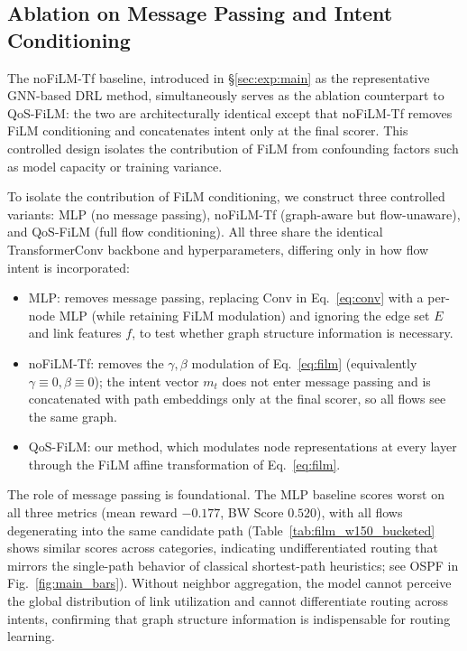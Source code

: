 \subsection{Ablation on Message Passing and Intent Conditioning}
\label{sec:exp:repr}
The noFiLM-Tf baseline, introduced in \S\ref{sec:exp:main} as the representative GNN-based DRL method, simultaneously serves as the ablation counterpart to QoS-FiLM: the two are architecturally identical except that noFiLM-Tf removes FiLM conditioning and concatenates intent only at the final scorer. This controlled design isolates the contribution of FiLM from confounding factors such as model capacity or training variance.

To isolate the contribution of FiLM conditioning, we construct three controlled variants: MLP (no message passing), noFiLM-Tf (graph-aware but flow-unaware), and QoS-FiLM (full flow conditioning). All three share the identical TransformerConv backbone and hyperparameters, differing only in how flow intent is incorporated:
\begin{itemize}
\item MLP: removes message passing, replacing $\mathrm{Conv}$ in Eq.~\eqref{eq:conv} with a per-node MLP (while retaining FiLM modulation) and ignoring the edge set $E$ and link features $f$, to test whether graph structure information is necessary.
\item noFiLM-Tf: removes the $\gamma,\beta$ modulation of Eq.~\eqref{eq:film} (equivalently $\gamma\equiv 0,\beta\equiv 0$); the intent vector $m_t$ does not enter message passing and is concatenated with path embeddings only at the final scorer, so all flows see the same graph.
\item QoS-FiLM: our method, which modulates node representations at every layer through the FiLM affine transformation of Eq.~\eqref{eq:film}.
\end{itemize}

The role of message passing is foundational. The MLP baseline scores worst on all three metrics (mean reward $-0.177$, BW Score $0.520$), with all flows degenerating into the same candidate path (Table~\ref{tab:film_w150_bucketed} shows similar scores across categories, indicating undifferentiated routing that mirrors the single-path behavior of classical shortest-path heuristics; see OSPF in Fig.~\ref{fig:main_bars}). Without neighbor aggregation, the model cannot perceive the global distribution of link utilization and cannot differentiate routing across intents, confirming that graph structure information is indispensable for routing learning.

